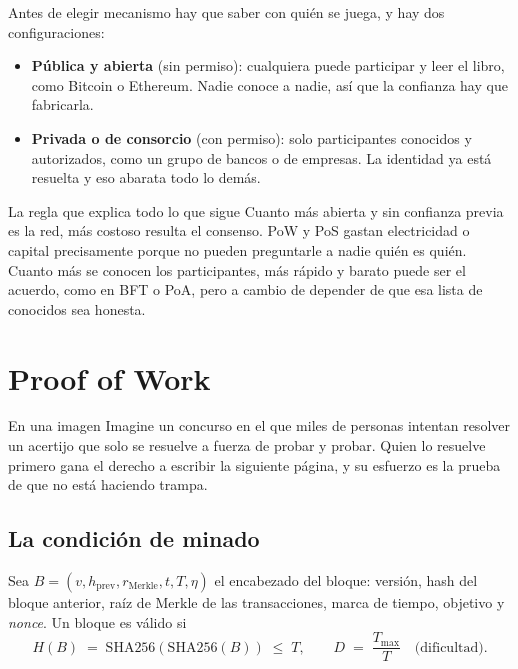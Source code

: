 \documentclass[11pt,a4paper]{article}
\theoremstyle{definition}
\theoremstyle{plain}
\theoremstyle{remark}
\begin{document}
Antes de elegir mecanismo hay que saber con quién se juega, y hay dos
configuraciones:

\begin{itemize}
  \item \textbf{Pública y abierta} (sin permiso): cualquiera puede participar y
        leer el libro, como Bitcoin o Ethereum. Nadie conoce a nadie, así que la
        confianza hay que fabricarla.
  \item \textbf{Privada o de consorcio} (con permiso): solo participantes
        conocidos y autorizados, como un grupo de bancos o de empresas. La
        identidad ya está resuelta y eso abarata todo lo demás.
\end{itemize}

\begin{clave}{La regla que explica todo lo que sigue}
Cuanto más abierta y sin confianza previa es la red, más costoso resulta el
consenso. PoW y PoS gastan electricidad o capital precisamente porque no pueden
preguntarle a nadie quién es quién. Cuanto más se conocen los participantes, más
rápido y barato puede ser el acuerdo, como en BFT o PoA, pero a cambio de
depender de que esa lista de conocidos sea honesta.
\end{clave}

\section{Proof of Work}\label{sec:pow}

\begin{nota}{En una imagen}
Imagine un concurso en el que miles de personas intentan resolver un acertijo que
solo se resuelve a fuerza de probar y probar. Quien lo resuelve primero gana el
derecho a escribir la siguiente página, y su esfuerzo es la prueba de que no está
haciendo trampa.
\end{nota}

\subsection{La condición de minado}

Sea $B = (v, h_{\text{prev}}, r_{\text{Merkle}}, t, T, \eta)$ el encabezado del
bloque: versión, hash del bloque anterior, raíz de Merkle de las transacciones,
marca de tiempo, objetivo y \emph{nonce}. Un bloque es válido si
\[
  H(B) \;=\; \mathrm{SHA256}(\mathrm{SHA256}(B)) \;\le\; T,
  \qquad D \;=\; \frac{T_{\max}}{T} \quad\text{(dificultad).}
\]
\end{document}
